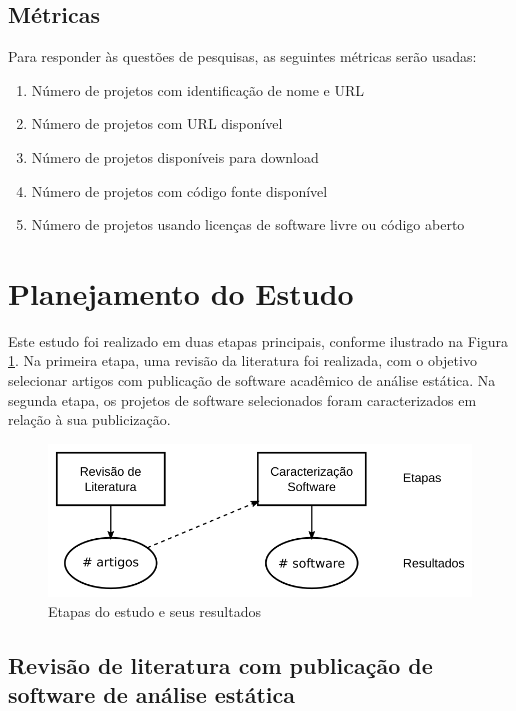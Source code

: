 \subsection{Métricas}

Para responder às questões de pesquisas, as seguintes métricas serão usadas:

\begin{enumerate}
  \item Número de projetos com identificação de nome e URL
  \item Número de projetos com URL disponível
  \item Número de projetos disponíveis para download
  \item Número de projetos com código fonte disponível
  \item Número de projetos usando licenças de software livre ou código aberto
\end{enumerate}


\section{Planejamento do Estudo} \label{estudo1:planejamento} %

Este estudo foi realizado em duas etapas principais, conforme ilustrado na
Figura \ref{estudo1-etapas}. Na primeira etapa, uma revisão da literatura
foi realizada, com o objetivo selecionar
artigos com publicação de software acadêmico de análise estática. 
Na segunda etapa, os projetos de software selecionados foram caracterizados
em relação à sua publicização.

\begin{figure}[h]
  \center
  \includegraphics[scale=0.4]{imagens/estudo1-etapas.png}
  \caption{Etapas do estudo e seus resultados}
  \label{estudo1-etapas}
\end{figure}

\subsection{Revisão de literatura com publicação de software de análise estática}

